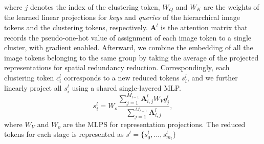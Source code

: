 \documentclass[sigconf]{acmart}
\begin{document}
where $j$ denotes the index of the clustering token, $W_Q$ and $W_K$ are the weights of the learned linear projections for \textit{keys} and \textit{queries} of the hierarchical image tokens and the clustering tokens, respectively.
$\mathbf{A}^l$ is the attention matrix that records the pseudo-one-hot value of assignment of each image token to a single cluster, with gradient enabled.
Afterward, we combine the embedding of all the image tokens belonging to the same group by taking the average of the projected representations for spatial redundancy reduction. 
Correspondingly, each clustering token ${{c}}_i^{l}$ corresponds to a new reduced tokens ${{s}}_i^{l}$, and we further linearly project all ${{s}}_i^{l}$ using a shared single-layered MLP.
\begin{equation}
\label{eqn:mapping}
    {s}_i^{l} =  W_o\frac{\sum_{j=1}^{M_{l-1}}\mathbf{A}_{i, j}^{l}W_V{g}_j^l}{\sum_{j=1}^{M_{l-1}} \mathbf{A}_{i, j}^{l}},
\end{equation}
where $W_V$ and $W_{o}$ are the MLPS for representation projections.
The reduced tokens for each stage is represented as $s^l=\{s_0^l,...,s_{m_l}^l\}$


\end{document}
